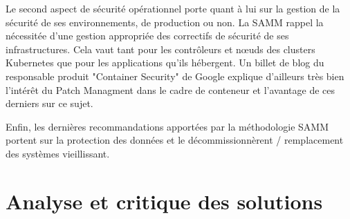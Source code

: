 Le second aspect de sécurité opérationnel porte quant à lui sur la gestion de la sécurité de ses environnements, de 
production ou non.
\newline La \ac{SAMM} rappel la nécessitée d'une gestion appropriée des correctifs de sécurité de ses infrastructures. 
Cela vaut tant pour les contrôleurs et nœuds des clusters Kubernetes que pour les applications qu'ils hébergent. 
\newline Un billet de blog du responsable produit "Container Security" de Google explique d'ailleurs très bien l'intérêt
du Patch Managment dans le cadre de conteneur et l'avantage de ces derniers sur ce sujet.\autocite{google_cont_sec_2018}

Enfin, les dernières recommandations apportées par la méthodologie \ac{SAMM} portent sur la protection des données et le
décommissionnèrent / remplacement des systèmes vieillissant.

\newpage

\section{Analyse et critique des solutions}
